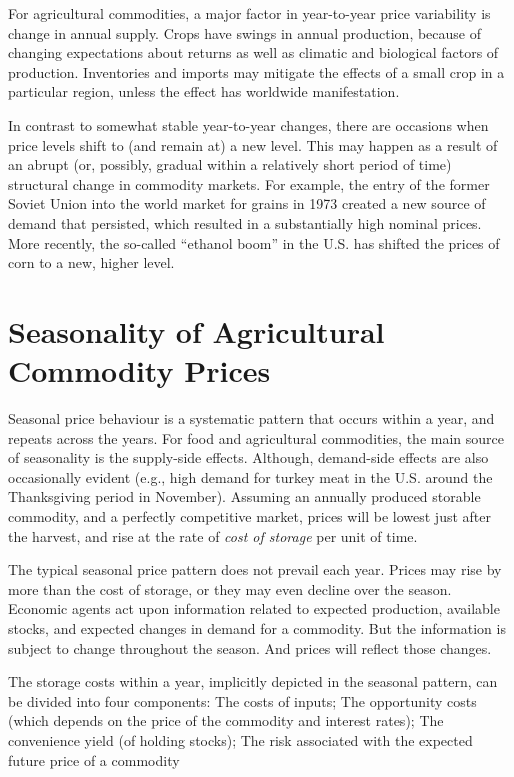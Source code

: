 \documentclass[
  oneside]{book}
\begin{document}
For agricultural commodities, a major factor in year-to-year price variability is change in annual supply. Crops have swings in annual production, because of changing expectations about returns as well as climatic and biological factors of production. Inventories and imports may mitigate the effects of a small crop in a particular region, unless the effect has worldwide manifestation.

In contrast to somewhat stable year-to-year changes, there are occasions when price levels shift to (and remain at) a new level. This may happen as a result of an abrupt (or, possibly, gradual within a relatively short period of time) structural change in commodity markets. For example, the entry of the former Soviet Union into the world market for grains in 1973 created a new source of demand that persisted, which resulted in a substantially high nominal prices. More recently, the so-called ``ethanol boom'' in the U.S. has shifted the prices of corn to a new, higher level.

\hypertarget{seasonality-of-agricultural-commodity-prices}{%
\section{Seasonality of Agricultural Commodity Prices}\label{seasonality-of-agricultural-commodity-prices}}

Seasonal price behaviour is a systematic pattern that occurs within a year, and repeats across the years. For food and agricultural commodities, the main source of seasonality is the supply-side effects. Although, demand-side effects are also occasionally evident (e.g., high demand for turkey meat in the U.S. around the Thanksgiving period in November). Assuming an annually produced storable commodity, and a perfectly competitive market, prices will be lowest just after the harvest, and rise at the rate of \emph{cost of storage} per unit of time.

The typical seasonal price pattern does not prevail each year. Prices may rise by more than the cost of storage, or they may even decline over the season. Economic agents act upon information related to expected production, available stocks, and expected changes in demand for a commodity. But the information is subject to change throughout the season. And prices will reflect those changes.

The storage costs within a year, implicitly depicted in the seasonal pattern, can be divided into four components: The costs of inputs; The opportunity costs (which depends on the price of the commodity and interest rates); The convenience yield (of holding stocks); The risk associated with the expected future price of a commodity
\end{document}

